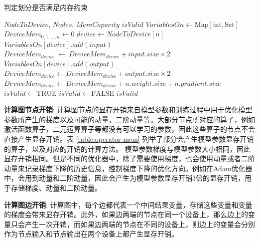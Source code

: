 \begin{algorithm}[h]
	\caption{判定划分是否满足内存约束}
	\label{alg:estimate-mem}
	\begin{algorithmic}[1]
	\REQUIRE $\mathit{NodeToDevice}$, $\mathit{Nodes}$, $\mathit{MemCapacity}$
	\ENSURE  $\mathit{isValid}$
	\STATE   $\mathit{VariablesOn} \leftarrow \mathrm{Map}[\mathrm{int}, \mathrm{Set}]$
	\STATE   $\mathit{DeviceMem}_{0,1,\dots,n} \leftarrow 0$
		\STATE $device \leftarrow \mathit{NodeToDevice}[n]$
				\STATE $\mathit{VariablesOn}[device].add(input)$
				\STATE $\mathit{DeviceMem}_{device}\ \leftarrow \ \mathit{DeviceMem}_{device} + input.size \times 2 $
			\ENDIF
		\ENDFOR
				\STATE $\mathit{VariablesOn}[device].add(output)$
				\STATE $\mathit{DeviceMem}_{device} \leftarrow  \mathit{DeviceMem}_{device} + output.size \times 2 $
			\ENDIF
		\ENDFOR
		\STATE $\mathit{DeviceMem}_{device} \leftarrow  \mathit{DeviceMem}_{device} + n.weight.size + n.gradient.size$
	\ENDFOR
	\STATE $\mathit{isValid}\leftarrow \mathrm{TRUE}$
			\STATE $\mathit{isValid}\leftarrow \mathrm{FALSE}$
		\ENDIF
	\ENDFOR
	\RETURN $\mathit{isValid}$
	\end{algorithmic}
\end{algorithm}

\textbf{计算图节点开销}: 计算图节点的显存开销来自模型参数和训练过程中用于优化模型参数所产生的梯度以及可能的动量，二阶动量等。大部分节点所对应的算子，例如激活函数算子，二元运算算子等都没有可以学习的参数，因此这些算子的节点不会直接产生显存开销。表 \ref{table:operator-mem} 列举了部分会产生模型参数显存开销的算子，以及对应的开销的计算方法。
模型参数梯度与模型参数大小相同，因此显存开销相同。但是不同的优化器中，除了需要使用梯度，也会使用动量或者二阶动量来记录梯度下降的历史信息，控制梯度下降的优化方向。例如在Adam优化器  中，会用到动量和二阶动量，因此会产生为模型参数显存开销3倍的显存开销，用于存储梯度、动量和二阶动量。

\textbf{计算图边开销}: 计算图中，每个边都代表一个中间结果变量，存储这些变量和变量的梯度会带来显存开销。此外，如果边两端的节点在同一个设备上，那么边上的变量只会产生一次开销，而如果边两端的节点在不同的设备上，则边上的变量会分别作为节点输入和节点输出在两个设备上都产生显存开销。

